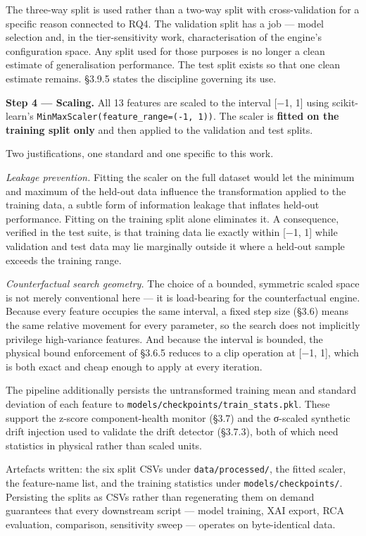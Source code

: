 The three-way split is used rather than a two-way split with cross-validation for a specific reason connected to RQ4. The validation split has a job --- model selection and, in the tier-sensitivity work, characterisation of the engine's configuration space. Any split used for those purposes is no longer a clean estimate of generalisation performance. The test split exists so that one clean estimate remains. §3.9.5 states the discipline governing its use.

\textbf{Step 4 --- Scaling.} All 13 features are scaled to the interval {[}−1, 1{]} using scikit-learn's \texttt{MinMaxScaler(feature\_range=(-1,\ 1))}. The scaler is \textbf{fitted on the training split only} and then applied to the validation and test splits.

Two justifications, one standard and one specific to this work.

\emph{Leakage prevention.} Fitting the scaler on the full dataset would let the minimum and maximum of the held-out data influence the transformation applied to the training data, a subtle form of information leakage that inflates held-out performance. Fitting on the training split alone eliminates it. A consequence, verified in the test suite, is that training data lie exactly within {[}−1, 1{]} while validation and test data may lie marginally outside it where a held-out sample exceeds the training range.

\emph{Counterfactual search geometry.} The choice of a bounded, symmetric scaled space is not merely conventional here --- it is load-bearing for the counterfactual engine. Because every feature occupies the same interval, a fixed step size (§3.6) means the same relative movement for every parameter, so the search does not implicitly privilege high-variance features. And because the interval is bounded, the physical bound enforcement of §3.6.5 reduces to a clip operation at {[}−1, 1{]}, which is both exact and cheap enough to apply at every iteration.

The pipeline additionally persists the untransformed training mean and standard deviation of each feature to \texttt{models/checkpoints/train\_stats.pkl}. These support the z-score component-health monitor (§3.7) and the σ-scaled synthetic drift injection used to validate the drift detector (§3.7.3), both of which need statistics in physical rather than scaled units.

Artefacts written: the six split CSVs under \texttt{data/processed/}, the fitted scaler, the feature-name list, and the training statistics under \texttt{models/checkpoints/}. Persisting the splits as CSVs rather than regenerating them on demand guarantees that every downstream script --- model training, XAI export, RCA evaluation, comparison, sensitivity sweep --- operates on byte-identical data.

